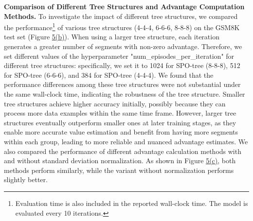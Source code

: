 \textbf{Comparison of Different Tree Structures and Advantage Computation Methods.} 
To investigate the impact of different tree structures, we compared the performance\footnote{Evaluation time is also included in the reported wall-clock time. The model is evaluated every 10 iterations.} of various tree structures (4-4-4, 6-6-6, 8-8-8) on the GSM8K test set (Figure \hyperref[fig:SPO-tree-results]{5(b)}). When using a larger tree structure, each iteration generates a greater number of segments with non-zero advantage. Therefore, we set different values of the hyperparameter "num\_episodes\_per\_iteration" for different tree structures: specifically, we set it to 1024 for SPO-tree (8-8-8), 512 for SPO-tree (6-6-6), and 384 for SPO-tree (4-4-4). We found that the performance differences among these tree structures were not substantial under the same wall-clock time, indicating the robustness of the tree structure. Smaller tree structures achieve higher accuracy initially, possibly because they can process more data examples within the same time frame. However, larger tree structures eventually outperform smaller ones at later training stages, as they enable more accurate value estimation and benefit from having more segments within each group, leading to more reliable and nuanced advantage estimates. We also compared the performance of different advantage calculation methods with and without standard deviation normalization. As shown in Figure \hyperref[fig:SPO-tree-results]{5(c)}, both methods perform similarly, while the variant without normalization performs slightly better.
